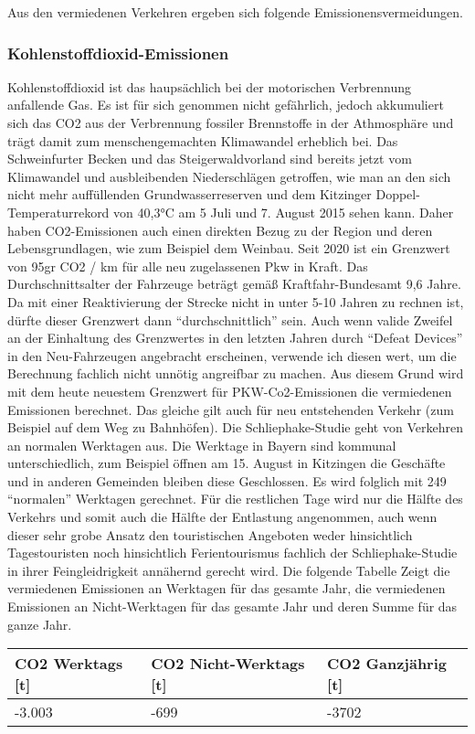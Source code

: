 \documentclass[fontsize=12pt,a4paper]{scrreprt}
\begin{document}
Aus den vermiedenen Verkehren ergeben sich folgende Emissionensvermeidungen.

\subsubsection{Kohlenstoffdioxid-Emissionen}

Kohlenstoffdioxid ist das haupsächlich bei der motorischen Verbrennung anfallende Gas. Es ist für sich genommen nicht gefährlich, jedoch akkumuliert sich das CO2 aus der Verbrennung fossiler Brennstoffe in der Athmosphäre und trägt damit zum menschengemachten Klimawandel erheblich bei.
Das Schweinfurter Becken und das Steigerwaldvorland sind bereits jetzt vom Klimawandel und ausbleibenden Niederschlägen getroffen, wie man an den sich nicht mehr auffüllenden Grundwasserreserven und dem Kitzinger Doppel-Temperaturrekord von 40,3°C am 5 Juli und 7. August 2015 sehen kann.
Daher haben CO2-Emissionen auch einen direkten Bezug zu der Region und deren Lebensgrundlagen, wie zum Beispiel dem Weinbau.
\newline
\newline
Seit 2020 ist ein Grenzwert von 95gr CO2 / km für alle neu zugelassenen Pkw in Kraft. Das Durchschnittsalter der Fahrzeuge beträgt gemäß Kraftfahr-Bundesamt 9,6 Jahre. Da mit einer Reaktivierung der Strecke nicht in unter 5-10 Jahren zu rechnen ist, dürfte dieser Grenzwert dann \enquote{durchschnittlich} sein. Auch wenn valide Zweifel an der Einhaltung des Grenzwertes in den letzten Jahren durch \enquote{Defeat Devices} in den Neu-Fahrzeugen angebracht erscheinen, verwende ich diesen wert, um die Berechnung fachlich nicht unnötig angreifbar zu machen.
Aus diesem Grund wird mit dem heute neuestem Grenzwert für PKW-Co2-Emissionen die vermiedenen Emissionen berechnet. Das gleiche gilt auch für neu entstehenden Verkehr (zum Beispiel auf dem Weg zu Bahnhöfen).
\newline
\newline
Die Schliephake-Studie geht von Verkehren an normalen Werktagen aus. Die Werktage in Bayern sind kommunal unterschiedlich, zum Beispiel öffnen am 15. August in Kitzingen die Geschäfte und in anderen Gemeinden bleiben diese Geschlossen. Es wird folglich mit 249 \enquote{normalen} Werktagen gerechnet. Für die restlichen Tage wird nur die Hälfte des Verkehrs und somit auch die Hälfte der Entlastung angenommen, auch wenn dieser sehr grobe Ansatz den touristischen Angeboten weder hinsichtlich Tagestouristen noch hinsichtlich Ferientourismus fachlich der Schliephake-Studie in ihrer Feingleidrigkeit annähernd gerecht wird.
\newline
\newline
Die folgende Tabelle Zeigt die vermiedenen Emissionen an Werktagen für das gesamte Jahr, die vermiedenen Emissionen an Nicht-Werktagen für das gesamte Jahr und deren Summe für das ganze Jahr.
\newline
\newline
\begin{tabular}{|l|l|l|}
\hline
CO2 Werktags [t] & CO2 Nicht-Werktags [t] & CO2 Ganzjährig [t]\\ 
\hline
-3.003 & -699 & -3702\\ 
\hline
\end{tabular}        
\end{document}
